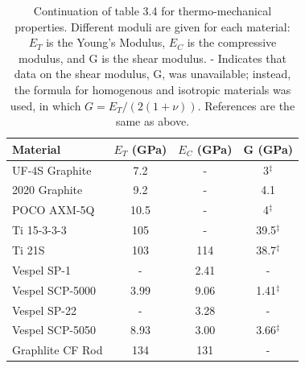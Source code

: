 \documentclass{report}
\begin{document}
\begin{table}[htb]
\begin{threeparttable}
\begin{tabular}{lccc}
\toprule
\textbf{Material} & $E_{T}$ (GPa) & $E_{C}$ (GPa) & G (GPa) \\
\midrule
 UF-4S Graphite & 7.2 & - & 3$^{\ddag}$ \\
 2020 Graphite & 9.2 & - & 4.1 \\
 POCO AXM-5Q & 10.5 & - & 4$^{\ddag}$ \\
 Ti 15-3-3-3 & 105 & - & 39.5$^{\ddag}$ \\
 Ti 21S & 103 & 114 & 38.7$^{\ddag}$ \\
 Vespel SP-1 & - & 2.41 & - \\
 Vespel SCP-5000 & 3.99 & 9.06 & 1.41$^{\ddag}$\\
 Vespel SP-22 & - & 3.28 & - \\
 Vespel SCP-5050 & 8.93 & 3.00 & 3.66$^{\ddag}$\\
 Graphlite CF Rod & 134 & 131 & - \\
 \bottomrule
\end{tabular}
\caption{Continuation of table 3.4 for thermo-mechanical properties. Different moduli are given for each material: $E_{T}$ is the Young's Modulus, $E_{C}$ is the compressive modulus, and G is the shear modulus. \ddag - Indicates that data on the shear modulus, G, was unavailable; instead, the formula for homogenous and isotropic materials was used, in which $G = E_{T}/(2(1 + \nu))$. References are the same as above. }
\end{threeparttable}
\end{table}
\end{document}
